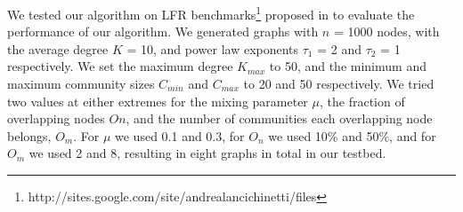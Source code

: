 


We tested our algorithm on LFR benchmarks\footnote{http://sites.google.com/site/andrealancichinetti/files} proposed in \cite{2008PhRvE..78d6110L} to evaluate the performance of our algorithm. We generated graphs with $n$ = 1000 nodes, with the average degree $K$ = 10, and power law exponents $\tau_1$ = 2 and $\tau_2$ = 1 respectively. We set the maximum degree $K_{max}$ to 50, and the minimum and maximum community sizes $C_{min}$ and $C_{max}$ to 20 and 50 respectively. We tried two values at either extremes for the mixing parameter $\mu$, the fraction of overlapping nodes $On$, and the number of communities each overlapping node belongs, $O_m$. For $\mu$ we used 0.1 and 0.3, for $O_n$ we used 10$\%$ and 50$\%$, and for $O_m$ we used 2 and 8, resulting in eight graphs in total in our testbed.


